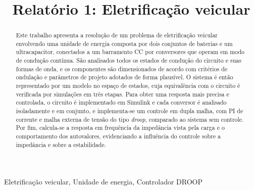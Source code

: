 \documentclass[conference]{IEEEtran}
\begin{document}
\title{Relatório 1: Eletrificação veicular}
\author{
\and
{}
}

\maketitle
\thispagestyle{plain}

\begin{abstract}
Este trabalho apresenta a resolução de um problema de eletrificação veicular envolvendo uma unidade de energia composta por dois conjuntos de baterias e um ultracapacitor, conectados a um barramento CC por conversores que operam em modo de condução contínua. São analisados todos os estados de condução do circuito e suas formas de onda, e os componentes são dimensionados de acordo com critérios de ondulação e parâmetros de projeto adotados de forma plausível. O sistema é então representado por um modelo no espaço de estados, cuja equivalência com o circuito é verificada por simulações em três etapas. Para obter uma resposta mais precisa e controlada, o circuito é implementado em Simulink e cada conversor é analisado isoladamente e em conjunto, e implementa-se um controle em dupla malha, com PI de corrente e malha externa de tensão do tipo \textit{droop}, comparado ao sistema sem controle. Por fim, calcula-se a resposta em frequência da impedância vista pela carga e o comportamento dos autovalores, evidenciando a influência do controle sobre a impedância e sobre a estabilidade.
\end{abstract}

\begin{IEEEkeywords}
Eletrificação veicular, Unidade de energia, Controlador DROOP
\end{IEEEkeywords}








\end{document}
